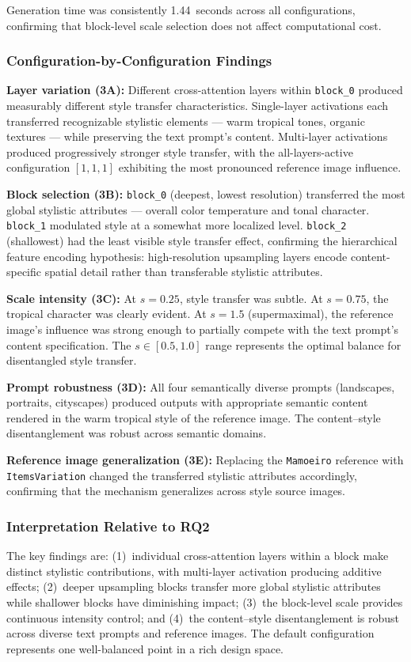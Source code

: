 \documentclass[conference]{IEEEtran}
\begin{document}
Generation time was consistently 1.44~seconds across all configurations, confirming that block-level scale selection does not affect computational cost.

\subsubsection{Configuration-by-Configuration Findings}
\textbf{Layer variation (3A):} Different cross-attention layers within \texttt{block\_0} produced measurably different style transfer characteristics. Single-layer activations each transferred recognizable stylistic elements --- warm tropical tones, organic textures --- while preserving the text prompt's content. Multi-layer activations produced progressively stronger style transfer, with the all-layers-active configuration \([1,1,1]\) exhibiting the most pronounced reference image influence.

\textbf{Block selection (3B):} \texttt{block\_0} (deepest, lowest resolution) transferred the most global stylistic attributes --- overall color temperature and tonal character. \texttt{block\_1} modulated style at a somewhat more localized level. \texttt{block\_2} (shallowest) had the least visible style transfer effect, confirming the hierarchical feature encoding hypothesis: high-resolution upsampling layers encode content-specific spatial detail rather than transferable stylistic attributes.

\textbf{Scale intensity (3C):} At \(s = 0.25\), style transfer was subtle. At \(s = 0.75\), the tropical character was clearly evident. At \(s = 1.5\) (supermaximal), the reference image's influence was strong enough to partially compete with the text prompt's content specification. The \(s \in [0.5, 1.0]\) range represents the optimal balance for disentangled style transfer.

\textbf{Prompt robustness (3D):} All four semantically diverse prompts (landscapes, portraits, cityscapes) produced outputs with appropriate semantic content rendered in the warm tropical style of the reference image. The content--style disentanglement was robust across semantic domains.

\textbf{Reference image generalization (3E):} Replacing the \texttt{Mamoeiro} reference with \texttt{ItemsVariation} changed the transferred stylistic attributes accordingly, confirming that the mechanism generalizes across style source images.

\subsubsection{Interpretation Relative to RQ2}
The key findings are: (1)~individual cross-attention layers within a block make distinct stylistic contributions, with multi-layer activation producing additive effects; (2)~deeper upsampling blocks transfer more global stylistic attributes while shallower blocks have diminishing impact; (3)~the block-level scale provides continuous intensity control; and (4)~the content--style disentanglement is robust across diverse text prompts and reference images. The default configuration represents one well-balanced point in a rich design space.
\end{document}
